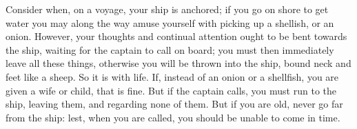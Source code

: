 Consider when, on a voyage, your ship is anchored; if you go on
shore to get water you may along the way amuse yourself with picking
up a shellish, or an onion. However, your thoughts and continual attention
ought to be bent towards the ship, waiting for the captain to call
on board; you must then immediately leave all these things, otherwise
you will be thrown into the ship, bound neck and feet like a sheep.
So it is with life. If, instead of an onion or a shellfish, you are
given a wife or child, that is fine. But if the captain calls, you
must run to the ship, leaving them, and regarding none of them. But
if you are old, never go far from the ship: lest, when you are called,
you should be unable to come in time. 
